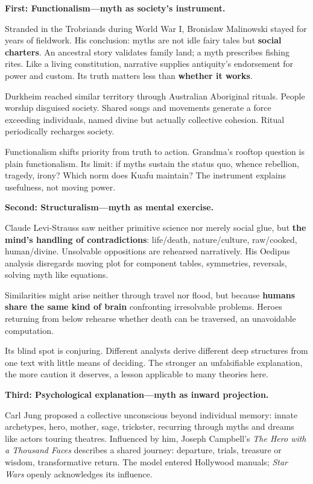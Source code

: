 \textbf{First: Functionalism---myth as society's instrument.}

Stranded in the Trobriands during World War I, Bronislaw Malinowski stayed for years of fieldwork. His conclusion: myths are not idle fairy tales but \textbf{social charters}. An ancestral story validates family land; a myth prescribes fishing rites. Like a living constitution, narrative supplies antiquity's endorsement for power and custom. Its truth matters less than \textbf{whether it works}.

Durkheim reached similar territory through Australian Aboriginal rituals. People worship disguised society. Shared songs and movements generate a force exceeding individuals, named divine but actually collective cohesion. Ritual periodically recharges society.

Functionalism shifts priority from truth to action. Grandma's rooftop question is plain functionalism. Its limit: if myths sustain the status quo, whence rebellion, tragedy, irony? Which norm does Kuafu maintain? The instrument explains usefulness, not moving power.

\textbf{Second: Structuralism---myth as mental exercise.}

Claude Levi-Strauss saw neither primitive science nor merely social glue, but \textbf{the mind's handling of contradictions}: life/death, nature/culture, raw/cooked, human/divine. Unsolvable oppositions are rehearsed narratively. His Oedipus analysis disregards moving plot for component tables, symmetries, reversals, solving myth like equations.

Similarities might arise neither through travel nor flood, but because \textbf{humans share the same kind of brain} confronting irresolvable problems. Heroes returning from below rehearse whether death can be traversed, an unavoidable computation.

Its blind spot is conjuring. Different analysts derive different deep structures from one text with little means of deciding. The stronger an unfalsifiable explanation, the more caution it deserves, a lesson applicable to many theories here.

\textbf{Third: Psychological explanation---myth as inward projection.}

Carl Jung proposed a collective unconscious beyond individual memory: innate archetypes, hero, mother, sage, trickster, recurring through myths and dreams like actors touring theatres. Influenced by him, Joseph Campbell's \textit{The Hero with a Thousand Faces} describes a shared journey: departure, trials, treasure or wisdom, transformative return. The model entered Hollywood manuals; \textit{Star Wars} openly acknowledges its influence.

